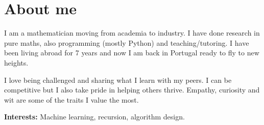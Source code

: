 \documentclass[a4paper,11pt]{twentysecondcv} %
\begin{document}


		


\makeprofile %


\color{black!80} \cvnamefont {}\selectfont
\linespread{1}
\vspace{-5pt}
\section{About me} 
	\begin{onehalfspace}
		I am a mathematician moving from academia to industry. 
		I have done research in pure maths, also programming (mostly Python) and teaching/tutoring.
		I have been living abroad for 7 years and now I am back in Portugal ready to fly to new heights.
		
		
		I love being challenged and sharing what I learn with my peers.
		I can be competitive but I also take pride in helping others thrive. Empathy, curiosity and wit are some of the traits I value the most.
		
		\textbf{Interests:} Machine learning, recursion, algorithm design.
	\end{onehalfspace}
\end{document}
